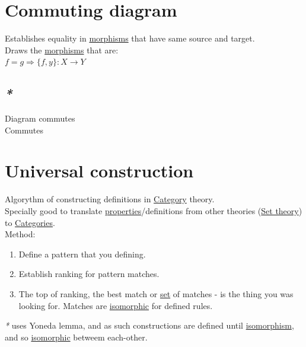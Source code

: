 \documentclass[a4paper,14pt,oneside]{book}
\begin{document}
\section{\label{org638b2f9}Commuting diagram}
\label{sec:org14e4bbf}
Establishes equality in \hyperref[org801ca09]{morphisms} that have same source and target.\\

Draws the \hyperref[org801ca09]{morphisms} that are:\\
\(f = g \Rightarrow \{f, y\}: X \to Y\)\\

\subsection{\emph{*}}
\label{sec:org1389f45}

\label{orge531e83}Diagram commutes\\
\label{org395d662}Commutes\\

\section{\label{orge4be823}Universal construction}
\label{sec:orgc6b7300}
Algorythm of constructing definitions in \hyperref[org74d6ac5]{Category} theory.\\
Specially good to translate \hyperref[orge2c24e7]{properties}/definitions from other theories (\hyperref[org709c7ea]{Set theory}) to \hyperref[org41a3e52]{Categories}.\\

Method:\\
\begin{enumerate}
\item Define a pattern that you defining.\\
\item Establish ranking for pattern matches.\\
\item The top of ranking, the best match or \hyperref[org2ca93d9]{set} of matches - is the thing you was looking for. Matches are \hyperref[org9fcbb95]{isomorphic} for defined rules.\\
\end{enumerate}

\emph{*} uses Yoneda lemma, and as such constructions are defined until \hyperref[org9f46a92]{isomorphism}, and so \hyperref[org9fcbb95]{isomorphic} betweem each-other.\\
\end{document}
